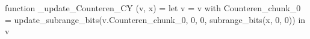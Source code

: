 function _update_Counteren_CY (v, x) = let v = { v with Counteren_chunk_0 = update_subrange_bits(v.Counteren_chunk_0, 0, 0, subrange_bits(x, 0, 0)) } in
  v

